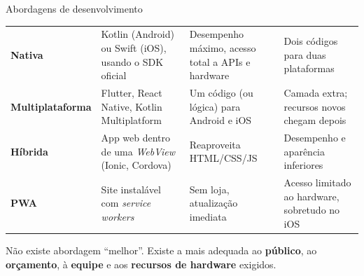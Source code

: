 \documentclass[aspectratio=169,10pt]{beamer}
\begin{document}
\begin{frame}{Abordagens de desenvolvimento}
  \footnotesize
  \begin{tabularx}{\textwidth}{@{}l L L L@{}}
    \toprule
     &  &  &  \\
    \midrule
    \textbf{Nativa} & Kotlin (Android) ou Swift (iOS), usando o SDK oficial & Desempenho máximo, acesso total a APIs e hardware & Dois códigos para duas plataformas \\
    \textbf{Multiplataforma} & Flutter, React Native, Kotlin Multiplatform & Um código (ou lógica) para Android e iOS & Camada extra; recursos novos chegam depois \\
    \textbf{Híbrida} & App web dentro de uma \emph{WebView} (Ionic, Cordova) & Reaproveita HTML/CSS/JS & Desempenho e aparência inferiores \\
    \textbf{PWA} & Site instalável com \emph{service workers} & Sem loja, atualização imediata & Acesso limitado ao hardware, sobretudo no iOS \\
    \bottomrule
  \end{tabularx}
  \vspace{4pt}
  \begin{dica}
    Não existe abordagem ``melhor''. Existe a mais adequada ao \textbf{público}, ao \textbf{orçamento}, à \textbf{equipe} e aos \textbf{recursos de hardware} exigidos.
  \end{dica}
\end{frame}
\end{document}

